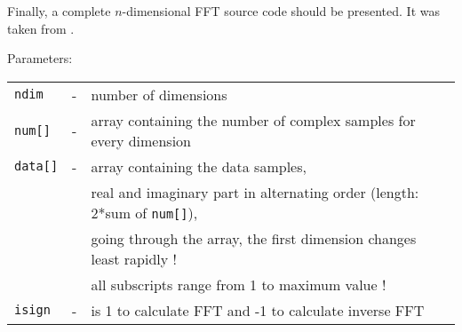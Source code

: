 Finally, a complete $n$-dimensional FFT source code should be
presented. It was taken from \cite{Press}.

\addvspace{12pt}

Parameters:\\
\begin{tabular}{lcl}
\texttt{ndim}   & - & number of dimensions\\
\texttt{num[]}  & - & array containing the number of complex samples for every dimension\\
\texttt{data[]} & - & array containing the data samples,\\
                &   & real and imaginary part in alternating order (length: 2*sum of \texttt{num[]}),\\
                &   & going through the array, the first dimension changes least rapidly !\\
                &   & all subscripts range from 1 to maximum value !\\
\texttt{isign}  & - & is 1 to calculate FFT and -1 to calculate inverse FFT
\end{tabular}

\addvspace{12pt}

